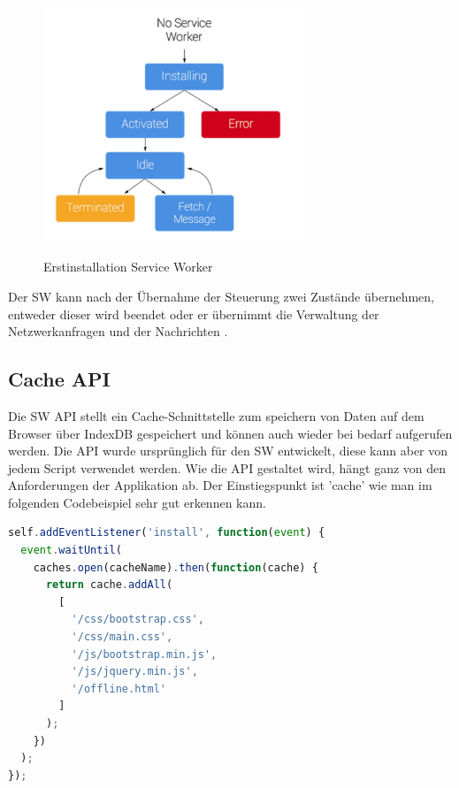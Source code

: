 \begin{figure}[h]
	\centering
	\includegraphics[width=8cm]{BilderAllgemein/InstallSW}\medskip
	\caption{Erstinstallation Service Worker}
	\label{fig:Erstinstallation}\cite{ServiceWorkerRegistration}
\end{figure}

Der \acs{SW} kann nach der Übernahme der Steuerung zwei Zustände übernehmen, entweder dieser wird beendet oder er übernimmt die Verwaltung der Netzwerkanfragen und der Nachrichten \cite{ServiceWorkerRegistration}.



\subsection{Cache API}
Die \acs{SW} API stellt ein Cache-Schnittstelle zum speichern von Daten auf dem Browser über IndexDB \cite{IndexDB} gespeichert und können auch wieder bei bedarf aufgerufen werden. Die API wurde ursprünglich für den \acs{SW} entwickelt, diese kann aber von jedem Script verwendet werden. 
Wie die API gestaltet wird, hängt ganz von den Anforderungen der Applikation ab.
Der Einstiegspunkt ist 'cache' wie man im folgenden Codebeispiel sehr gut erkennen kann.

\begin{lstlisting}[language=JavaScript, caption={Service Worker Cache},label=lst:ServiceWorkerCache, xleftmargin=50pt, label=cache]
self.addEventListener('install', function(event) {
  event.waitUntil(
    caches.open(cacheName).then(function(cache) {
      return cache.addAll(
        [
          '/css/bootstrap.css',
          '/css/main.css',
          '/js/bootstrap.min.js',
          '/js/jquery.min.js',
          '/offline.html'
        ]
      );
    })
  );
});
\end{lstlisting}

